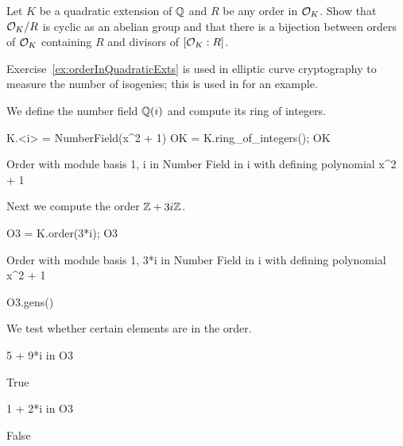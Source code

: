 \begin{exercise}\label{ex:orderInQuadraticExts}
	Let $K$ be a quadratic extension of $\mathbb{Q}$
	and $R$ be any order in $\mathcal{O}_K$.
	Show that $\mathcal{O}_K/R$ is cyclic as an abelian group
	and that there is a bijection between orders of
	$\mathcal{O}_K$ containing $R$ and divisors of $[\mathcal{O}_K:R]$.
\end{exercise}

\begin{remark}
	Exercise~\ref{ex:orderInQuadraticExts} is used in
	elliptic curve cryptography to measure the number
	of isogenies; this is used in \cite[\S11.2]{Koblitz2011781}
	for an example.
\end{remark}

We define the number field $\mathbb{Q}(i)$ and compute its
ring of integers.
\begin{sagecode}
\begin{sagecell}
K.<i> = NumberField(x^2 + 1)
OK = K.ring_of_integers(); OK
\end{sagecell}
\begin{sageout}
Order with module basis 1, i in Number Field in i with 
defining polynomial x^2 + 1
\end{sageout}
\end{sagecode}

\noindent Next we compute the order $\mathbb{Z} + 3i \mathbb{Z}$.
\begin{sagecode}
\begin{sagecell}
O3 = K.order(3*i); O3
\end{sagecell}
\begin{sageout}
Order with module basis 1, 3*i in Number Field in i with 
defining polynomial x^2 + 1
\end{sageout}
\begin{sagecell}
O3.gens()
\end{sagecell}
\begin{sageout}
[1, 3*i]
\end{sageout}
\end{sagecode}


\noindent We test whether certain elements are in the order.
\begin{sagecode}
\begin{sagecell}
5 + 9*i in O3
\end{sagecell}
\begin{sageout}
True
\end{sageout}
\begin{sagecell}
1 + 2*i in O3
\end{sagecell}
\begin{sageout}
False
\end{sageout}
\end{sagecode}


